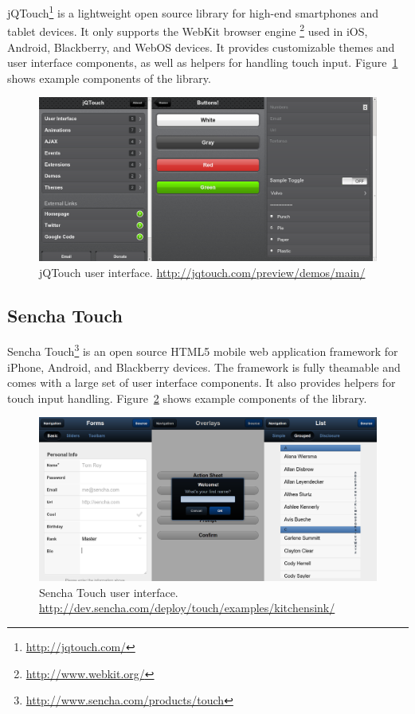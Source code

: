 jQTouch\footnote{\url{http://jqtouch.com/}} is a lightweight open
source library for high-end smartphones and tablet devices. It only
supports the WebKit browser
engine \footnote{\url{http://www.webkit.org/}} used in iOS, Android,
Blackberry, and WebOS devices. It provides customizable themes and
user interface components, as well as helpers for handling touch
input. Figure~\ref{figure:jqtouch.png} shows example components of the
library.

\begin{figure}[h!]
  \begin{center}
    \includegraphics[width=\textwidth]{images/jqtouch.png}
    \caption{jQTouch user
      interface. \url{http://jqtouch.com/preview/demos/main/}}
    \label{figure:jqtouch.png}
  \end{center}
\end{figure}

\subsection{Sencha Touch}

Sencha Touch\footnote{\url{http://www.sencha.com/products/touch}} is
an open source HTML5 mobile web application framework for iPhone,
Android, and Blackberry devices. The framework is fully theamable and
comes with a large set of user interface components. It also provides
helpers for touch input handling. Figure~\ref{figure:sencha.png} shows
example components of the library.

\begin{figure}[h!]
  \begin{center}
    \includegraphics[width=\textwidth]{images/sencha.png}
    \caption{Sencha Touch user
      interface. \url{http://dev.sencha.com/deploy/touch/examples/kitchensink/}}
    \label{figure:sencha.png}
  \end{center}
\end{figure}

